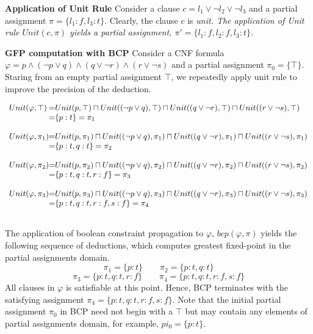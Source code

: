 %
\begin{example}
  \textbf{Application of Unit Rule} 
  Consider a clause $c=l_1 \vee \neg l_2 \vee \neg l_3$ and a partial assignment
  $\pi=\{l_1:f,l_3:t\}$. Clearly, the clause $c$ is \em{unit}.  The application
  of Unit rule $Unit(c, \pi)$ yields a partial assignment, $\pi'=\{l_1:f,l_2:f,l_3:t\}$. 
\end{example}
%
\begin{example}
  \textbf{GFP computation with BCP} 
  Consider a CNF formula $\varphi = p \wedge (\neg p \vee q) \wedge (q \vee \neg
  r) \wedge (r \vee \neg s)$ and a partial assignment $\pi_0=\{\top\}$. Staring
  from an empty partial assignment $\top$, we repeatedly apply unit rule to
  improve the precision of the deduction. 
\end{example}
  $\begin{array}{l@{}c@{}l}
    Unit(\varphi, \top) &=& Unit(p, \top) \sqcap Unit((\neg p \vee q), \top)
  \sqcap Unit((q \vee \neg r), \top) \sqcap Unit((r \vee \neg s), \top) \\
   &=& \{p:t\} = \pi_1 \\ \\
    
    Unit(\varphi, \pi_1) &=& Unit(p, \pi_1) \sqcap Unit((\neg p \vee q),
    \pi_1) \sqcap Unit((q \vee \neg r), \pi_1) \sqcap Unit((r \vee \neg s),
    \pi_1) \\
    &=& \{p:t, q:t \}  = \pi_2 \\ \\ 
    
    Unit(\varphi, \pi_2) &=& Unit(p, \pi_2) \sqcap Unit((\neg p \vee q),
    \pi_2) \sqcap Unit((q \vee \neg r), \pi_2) \sqcap Unit((r \vee \neg s),
    \pi_2) \\
    &=& \{p:t, q:t, r:f \}  = \pi_3 \\ \\ 

    Unit(\varphi, \pi_3) &=& Unit(p, \pi_3) \sqcap Unit((\neg p \vee q),
    \pi_3) \sqcap Unit((q \vee \neg r), \pi_3) \sqcap Unit((r \vee \neg s),
    \pi_3) \\
    &=& \{p:t, q:t, r:f, s:f \}  = \pi_4 \\ \\ 
  \end{array}$

  The application of boolean constraint propagation to $\varphi$, $bcp(\varphi,\pi)$
  yields the following sequence of deductions, which computes greatest
  fixed-point in the partial assignments domain. 
  \[\pi_1=\{p:t\} \qquad \pi_2=\{p:t,q:t\} \] 
  \[
  \pi_3=\{p:t,q:t,r:f\} \qquad \pi_4=\{p:t,q:t,r:f,s:f\}
  \]
  All clauses in $\varphi$ is satisfiable at this point. Hence, BCP terminates
  with the satisfying assignment $\pi_4=\{p:t,q:t,r:f,s:f\}$. Note that the
  initial partial assignment $\pi_0$ in BCP need not begin with a $\top$ but 
  may contain any elements of partial assignments domain, for example,
  $pi_0=\{p:t\}$.


